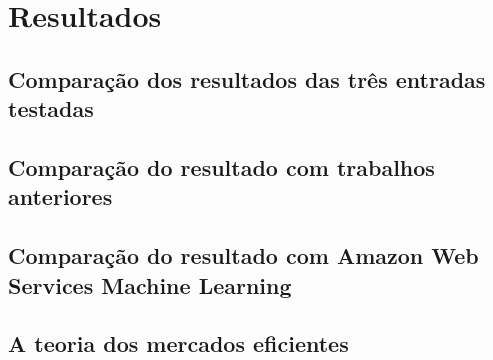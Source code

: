 \section{Resultados}

\subsection{Comparação dos resultados das três entradas testadas}

\subsection{Comparação do resultado com trabalhos anteriores}

\subsection{Comparação do resultado com Amazon Web Services Machine Learning}

\subsection{A teoria dos mercados eficientes}